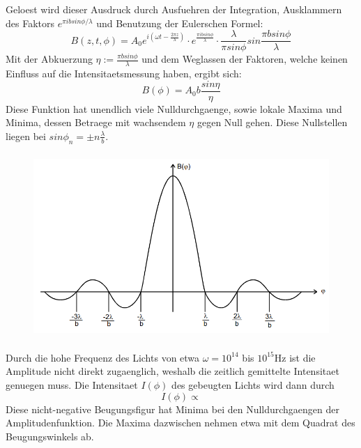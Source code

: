 Geloest wird dieser Ausdruck durch Ausfuehren der Integration, Ausklammern des Faktors $e^{\pi ibsin\phi/\lambda}$ und Benutzung der Eulerschen Formel:
\begin{equation*}
    B(z, t, \phi)=A_0e^{i(\omega t-\frac{2\pi z}{\lambda})}\cdot e^{\frac{\pi ibsin\phi}{\lambda}}\cdot\frac{\lambda}{\pi sin\phi}sin\frac{\pi bsin\phi}{\lambda}
\end{equation*}
Mit der Abkuerzung $\eta:=\frac{\pi bsin\phi}{\lambda}$ und dem Weglassen der Faktoren, welche keinen Einfluss auf die Intensitaetsmessung haben, ergibt sich:
\begin{equation*}
    B(\phi)=A_0b\frac{sin\eta}{\eta}
\end{equation*}
Diese Funktion hat unendlich viele Nulldurchgaenge, sowie lokale Maxima und Minima, dessen Betraege mit wachsendem $\eta$ gegen Null gehen. Diese Nullstellen liegen bei $sin\phi_n=\pm n\frac{\lambda}{b}$.
\begin{figure}[H]
    \centering
    \captionsetup{justification=centering}
    \includegraphics[height=7cm]{"Amplitude_BeugungSpalt.png"}
    \label{Fig:Amplitude}
\end{figure}
Durch die hohe Frequenz des Lichts von etwa $\omega=10^{14}$ bis $10^15$Hz ist die Amplitude nicht direkt zugaenglich, weshalb die zeitlich gemittelte Intensitaet genuegen muss. Die Intensitaet $I(\phi)$ des gebeugten Lichts wird dann durch 
\begin{equation*}
    I(\phi ) \propto %
\end{equation*}
Diese nicht-negative Beugungsfigur hat Minima bei den Nulldurchgaengen der Amplitudenfunktion. Die Maxima dazwischen nehmen etwa mit dem Quadrat des Beugungswinkels ab.

